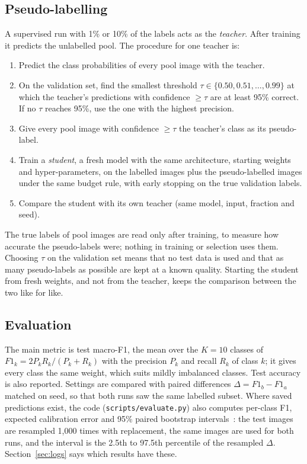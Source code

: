 \documentclass[conference]{IEEEtran}
\newcommand{\tabdir}{../results/tables}
\begin{document}


\subsection{Pseudo-labelling}
A supervised run with 1\% or 10\% of the labels acts as the \emph{teacher}. After training it predicts the unlabelled pool. The procedure for one teacher is:
\begin{enumerate}
\item Predict the class probabilities of every pool image with the teacher.
\item On the validation set, find the smallest threshold $\tau\in\{0.50,0.51,\dots,0.99\}$ at which the teacher's predictions with confidence $\geq\tau$ are at least 95\% correct. If no $\tau$ reaches 95\%, use the one with the highest precision.
\item Give every pool image with confidence $\geq\tau$ the teacher's class as its pseudo-label.
\item Train a \emph{student}, a fresh model with the same architecture, starting weights and hyper-parameters, on the labelled images plus the pseudo-labelled images under the same budget rule, with early stopping on the true validation labels.
\item Compare the student with its own teacher (same model, input, fraction and seed).
\end{enumerate}
The true labels of pool images are read only after training, to measure how accurate the pseudo-labels were; nothing in training or selection uses them. Choosing $\tau$ on the validation set means that no test data is used and that as many pseudo-labels as possible are kept at a known quality. Starting the student from fresh weights, and not from the teacher, keeps the comparison between the two like for like.

\subsection{Evaluation}
The main metric is test macro-F1, the mean over the $K=10$ classes of $F1_k = 2P_kR_k/(P_k+R_k)$ with the precision $P_k$ and recall $R_k$ of class $k$; it gives every class the same weight, which suits mildly imbalanced classes. Test accuracy is also reported. Settings are compared with paired differences $\Delta = F1_b - F1_a$ matched on seed, so that both runs saw the same labelled subset. Where saved predictions exist, the code (\texttt{scripts/evaluate.py}) also computes per-class F1, expected calibration error and 95\% paired bootstrap intervals~\cite{efron1979bootstrap}: the test images are resampled 1{,}000 times with replacement, the same images are used for both runs, and the interval is the 2.5th to 97.5th percentile of the resampled $\Delta$. Section~\ref{sec:logs} says which results have these.
\end{document}
